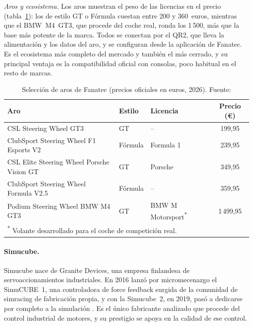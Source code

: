 \textit{Aros y ecosistema.} Los aros muestran el peso de las licencias en el precio (tabla~\ref{tab:fanatec-aros}): los de estilo GT o Fórmula cuestan entre 200 y 360~euros, mientras que el BMW~M4~GT3, que procede del coche real, ronda los 1\,500, más que la base más potente de la marca. Todos se conectan por el QR2, que lleva la alimentación y los datos del aro, y se configuran desde la aplicación de Fanatec. Es el ecosistema más completo del mercado y también el más cerrado, y su principal ventaja es la compatibilidad oficial con consolas, poco habitual en el resto de marcas.

\begin{table}[htbp]
	\centering
	\caption[Selección de aros de Fanatec (precios oficiales en euros, 2026)]{Selección de aros de Fanatec (precios oficiales en euros, 2026). Fuente: \parencite{fanatec_web}}
	\label{tab:fanatec-aros}
	\small
	\begin{tabular}{|l|l|l|c|}
		\hline
		\textbf{Aro} & \textbf{Estilo} & \textbf{Licencia} & \textbf{Precio (\euro)} \\
		\hline
		CSL Steering Wheel GT3                     & GT      & --        & 199,95 \\
		ClubSport Steering Wheel F1 Esports V2     & Fórmula & Formula 1 & 239,95 \\
		CSL Elite Steering Wheel Porsche Vision GT & GT      & Porsche   & 349,95 \\
		ClubSport Steering Wheel Formula V2.5      & Fórmula & --        & 359,95 \\
		Podium Steering Wheel BMW M4 GT3           & GT      & BMW M Motorsport\textsuperscript{*} & 1\,499,95 \\
		\hline
		\multicolumn{4}{l}{\footnotesize \textsuperscript{*} Volante desarrollado para el coche de competición real.} \\
	\end{tabular}
\end{table}



\paragraph{Simucube.}
Simucube nace de Granite Devices, una empresa finlandesa de servoaccionamientos industriales. En 2016 lanzó por micromecenazgo el SimuCUBE~1, una controladora de force feedback surgida de la comunidad de simracing de fabricación propia, y con la Simucube~2, en 2019, pasó a dedicarse por completo a la simulación \parencite{simucube_web}. Es el único fabricante analizado que procede del control industrial de motores, y su prestigio se apoya en la calidad de ese control.

